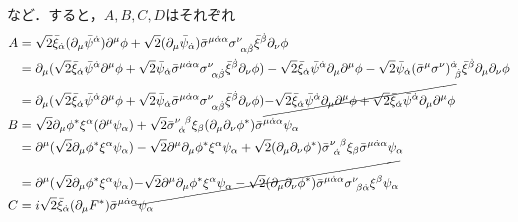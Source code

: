 \documentclass[a4paper,uplatex,dvipdfmx]{jsarticle}
\theoremstyle{definition}
\begin{document}
など．すると，$A,B,C,D$はそれぞれ
\begin{align}
  A
  &=
  \sqrt{2}\bar{\xi}_{\dot{\alpha}}(\partial_{\mu}\bar{\psi}^{\dot{\alpha}})\partial^{\mu}\phi  
  +
  \sqrt{2}(\partial_{\mu}\bar{\psi}_{\dot{\alpha}})\bar{\sigma}^{\mu\dot{\alpha}\alpha}\sigma^{\nu}_{\ \alpha\dot{\beta}}\bar{\xi}^{\dot{\beta}}\partial_{\nu}\phi
  \nonumber
  \\
  &=
  \partial_{\mu}  
  (
    \sqrt{2}\bar{\xi}_{\dot{\alpha}}\bar{\psi}^{\dot{\alpha}}\partial^{\mu}\phi
    +
    \sqrt{2}\bar{\psi}_{\dot{\alpha}}\bar{\sigma}^{\mu\dot{\alpha}\alpha}\sigma^{\nu}_{\ \alpha\dot{\beta}}\bar{\xi}^{\dot{\beta}}\partial_{\nu}\phi
  )
  -
  \sqrt{2}\bar{\xi}_{\dot{\alpha}}\bar{\psi}^{\dot{\alpha}}\partial_{\mu}\partial^{\mu}\phi  
  -
  \sqrt{2}\bar{\psi}_{\dot{\alpha}}(\bar{\sigma}^{\mu}\sigma^{\nu})^{\dot{\alpha}}_{\ \dot{\beta}}\bar{\xi}^{\dot{\beta}}\partial_{\mu}\partial_{\nu}\phi
  \nonumber
  \\
  &=
  \partial_{\mu}  
  (
    \sqrt{2}\bar{\xi}_{\dot{\alpha}}\bar{\psi}^{\dot{\alpha}}\partial^{\mu}\phi
    +
    \sqrt{2}\bar{\psi}_{\dot{\alpha}}\bar{\sigma}^{\mu\dot{\alpha}\alpha}\sigma^{\nu}_{\ \alpha\dot{\beta}}\bar{\xi}^{\dot{\beta}}\partial_{\nu}\phi
  )
  \cancel{
    -
    \sqrt{2}\bar{\xi}_{\dot{\alpha}}\bar{\psi}^{\dot{\alpha}}\partial_{\mu}\partial^{\mu}\phi
    +
    \sqrt{2}\bar{\xi}_{\dot{\alpha}}\bar{\psi}^{\dot{\alpha}}\partial_{\mu}\partial^{\mu}\phi  
  }
  \\
  B
  &=
  \sqrt{2}\partial_{\mu}\phi^{*}\xi^{\alpha}(\partial^{\mu}\psi_{\alpha})
  +
  \sqrt{2}\bar{\sigma}^{\nu\ \beta}_{\ \dot{\alpha}}\xi_{\beta}(\partial_{\mu}\partial_{\nu}\phi^{*})\bar{\sigma}^{\mu\dot{\alpha}\alpha}\psi_{\alpha}
  \nonumber
  \\
  &=
  \partial^{\mu}
  (
    \sqrt{2}\partial_{\mu}\phi^{*}\xi^{\alpha}\psi_{\alpha}
  )
  -
  \sqrt{2}\partial^{\mu}\partial_{\mu}\phi^{*}\xi^{\alpha}\psi_{\alpha}
  +
  \sqrt{2}(\partial_{\mu}\partial_{\nu}\phi^{*})\bar{\sigma}^{\nu\ \beta}_{\ \dot{\alpha}}\xi_{\beta}\bar{\sigma}^{\mu\dot{\alpha}\alpha}\psi_{\alpha}
  \nonumber
  \\
  &=
  \partial^{\mu}
  (
    \sqrt{2}\partial_{\mu}\phi^{*}\xi^{\alpha}\psi_{\alpha}
  )
  \cancel{
    -
    \sqrt{2}\partial^{\mu}\partial_{\mu}\phi^{*}\xi^{\alpha}\psi_{\alpha}
    -
    \sqrt{2}(\partial_{\mu}\partial_{\nu}\phi^{*})\bar{\sigma}^{\mu\dot{\alpha}\alpha}\sigma^{\nu}_{\ \beta\dot{\alpha}}\xi^{\beta}\psi_{\alpha}
  }
  \\
  C
  &=
  i\sqrt{2}\bar{\xi}_{\dot{\alpha}}(\partial_{\mu}F^{*})\bar{\sigma}^{\mu\dot{\alpha}\alpha}\psi_{\alpha}

\end{align}
\end{document}

